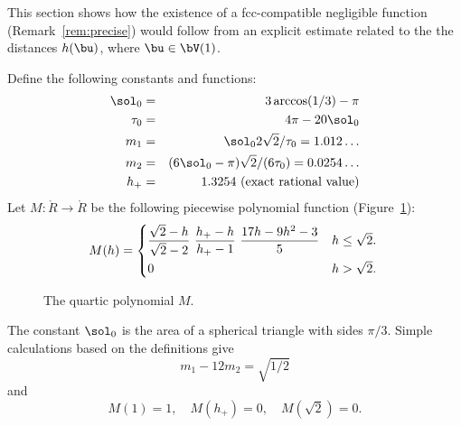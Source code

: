 This section shows how the existence of a fcc-compatible negligible
function (Remark~\ref{rem:precise})  would follow from an explicit
estimate related to the the distances $h(\bu)$, where $\bu\in \bV(1)$.



\begin{definition}
Define the following constants and functions: 
\begin{eqnarray}\label{eqn:m-def}
\sol_0 &=& 3\arccos(1/3)-\pi\\
\tau_0 &=& 4\pi  - 20\sol_0\\
m_1 &=& \sol_0 2\sqrt2/\tau_0 = 1.012\ldots \\ %
m_2  &=&  (6\sol_0- \pi)\sqrt2/(6 \tau_0) = 0.0254\ldots\\ %
h_+ &=& 1.3254 \hbox{~(exact rational value)}
\end{eqnarray}
Let $M:\ring{R}\to\ring{R}$ 
be the following piecewise polynomial function (Figure~\ref{fig:M}):
\begin{equation}\label{eqn:M}
M(h) =
\begin{cases}
\dfrac{\sqrt2-h}{\sqrt2-2}~ \dfrac{h_+-h}{h_+-1} ~\dfrac{17 h - 9 h^2 - 3}{5} & h \le \sqrt2.\vspace{3pt} \\
0 & h >\sqrt2.
\end{cases}
\\
\end{equation}
\end{definition}

\begin{figure}[htb]
\centering
{}
\caption{The quartic polynomial $M$.}
\label{fig:M}
\end{figure}

The constant $\sol_0$
is the area of a spherical triangle with sides $\pi/3$.
Simple calculations based on the definitions give
\begin{equation}\label{eqn:km}m_1 - 12m_2 = \sqrt{1/2}\end{equation}
and
\begin{equation}M(1) = 1,\quad M(h_+)=0,\quad M(\sqrt2) =0.\end{equation}


